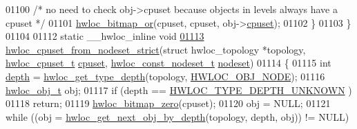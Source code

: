 \begin{DoxyCode}
01100                         \textcolor{comment}{/* no need to check obj->cpuset because objects in levels
       always have a cpuset */}
01101                         \hyperlink{a00065_ga1ba1de709ee9a7cf5cc8ad2d9a1a81d4}{hwloc_bitmap_or}(cpuset, cpuset, obj->\hyperlink{a00016_a67925e0f2c47f50408fbdb9bddd0790f}{cpuset});
01102         \}
01103 \}
01104 
01112 \textcolor{keyword}{static} \_\_hwloc\_inline \textcolor{keywordtype}{void}
\hypertarget{a00031_source_l01113}{}\hyperlink{a00062_gaa7c3f39802b00a758c58e024a8119979}{01113} \hyperlink{a00062_gaa7c3f39802b00a758c58e024a8119979}{hwloc_cpuset_from_nodeset_strict}(\textcolor{keyword}{struct} hwloc\_topology *topology, \hyperlink{a00040_ga4bbf39b68b6f568fb92739e7c0ea7801}{hwloc_cpuset_t} 
      \hyperlink{a00016_a67925e0f2c47f50408fbdb9bddd0790f}{cpuset}, \hyperlink{a00040_ga2f5276235841ad66a79bedad16a5a10c}{hwloc_const_nodeset_t} \hyperlink{a00016_a08f0d0e16c619a6e653526cbee4ffea3}{nodeset})
01114 \{
01115         \textcolor{keywordtype}{int} \hyperlink{a00016_a9d82690370275d42d652eccdea5d3ee5}{depth} = \hyperlink{a00046_gaea7c64dd59467f5201ba87712710b14d}{hwloc_get_type_depth}(topology, \hyperlink{a00041_ggacd37bb612667dc437d66bfb175a8dc55aaf0964881117bdedf1a5e9332cd120dd}{HWLOC_OBJ_NODE});
01116         \hyperlink{a00016}{hwloc_obj_t} obj;
01117         \textcolor{keywordflow}{if} (depth == \hyperlink{a00046_ggaf4e663cf42bbe20756b849c6293ef575a0565ab92ab72cb0cec91e23003294aad}{HWLOC_TYPE_DEPTH_UNKNOWN} )
01118                 \textcolor{keywordflow}{return};
01119         \hyperlink{a00065_ga6c540b9fe63b8223b6aba46d56dd63b8}{hwloc_bitmap_zero}(cpuset);
01120         obj = NULL;
01121         \textcolor{keywordflow}{while} ((obj = \hyperlink{a00053_gab7c1dce3f42ece5bfa621e87cf332418}{hwloc_get_next_obj_by_depth}(topology, depth, obj)) != NULL)
      

\end{DoxyCode}
